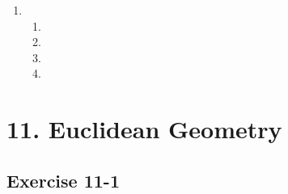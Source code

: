 \begin{enumerate}[itemsep=5pt, label=\textbf{\arabic*}. ]
    \begin{enumerate}[noitemsep, label=\textbf{(\alph*)} ]
    \item %
    \item %
    \item %
    \item %
    \item %
    \end{enumerate}
\item %
    \begin{enumerate}[noitemsep, label=\textbf{(\alph*)} ]
    \item %
    \item %
    \item %
    \item %
    \end{enumerate}
  \end{enumerate}





\section {11. Euclidean Geometry}
\subsection{Exercise 11-1} %
       
